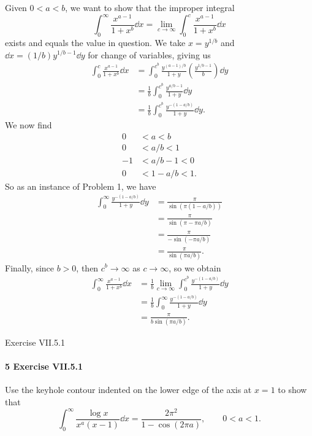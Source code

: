 \documentclass[12pt]{article}
\newenvironment{fullbox}{\begin{lrbox}{\savefullbox}\begin{minipage}{\dimexpr\textwidth-2\fboxsep\relax}}{\end{minipage}\end{lrbox}\begin{center}\framebox[\textwidth]{\usebox{\savefullbox}}\end{center}}
\newenvironment{pbox}[1][]{\begin{fullbox}\ifx#1\empty\else\paragraph{#1}\fi}{\end{fullbox}}
\theoremstyle{definition}
\newcommand{\pfrac}[2]{\left(\frac{#1}{#2}\right)}
\begin{document}
Given $0 < a < b$, we want to show that the improper integral
\[
        \int_{0}^{\infty} \frac{x^{a-1}}{1 + x^b} \dd{x}
            =\lim_{c \to \infty} \int_{0}^{c} \frac{x^{a-1}}{1 + x^b} \dd{x}
\]
exists and equals the value in question. We take $x = y^{1/b}$ and $\dd{x} = (1/b)y^{1/b - 1}\dd{y}$ for change of variables, giving us
\begin{align*}
    \int_{0}^{c} \frac{x^{a-1}}{1 + x^b} \dd{x}
        &= \int_{0}^{c^b} \frac{y^{(a-1)/b}}{1 + y} \pfrac{y^{1/b-1}}{b} \dd{y} \\
        &= \frac{1}{b} \int_{0}^{c^b} \frac{y^{a/b-1}}{1 + y} \dd{y} \\
        &= \frac{1}{b} \int_{0}^{c^b} \frac{y^{-(1 - a/b)}}{1 + y} \dd{y}.
\end{align*}
We now find
\begin{align*}
    0 &< a < b \\
    0 &< a/b < 1 \\
    -1 &< a/b - 1 < 0 \\
    0 &< 1 - a/b < 1.
\end{align*}
So as an instance of Problem 1, we have
\begin{align*}
    \int_{0}^{\infty} \frac{y^{-(1 - a/b)}}{1 + y} \dd{y}
        &= \frac{\pi}{\sin(\pi(1 - a/b))} \\
        &= \frac{\pi}{\sin(\pi - \pi a/b)} \\
        &= \frac{\pi}{-\sin(-\pi a/b)} \\
        &= \frac{\pi}{\sin(\pi a/b)}.
\end{align*}
Finally, since $b > 0$, then $c^b \to \infty$ as $c \to \infty$, so we obtain
\begin{align*}
    \int_{0}^{\infty} \frac{x^{a-1}}{1 + x^b} \dd{x}
        &= \frac{1}{b} \lim_{c \to \infty} \int_{0}^{c^b} \frac{y^{-(1 - a/b)}}{1 + y} \dd{y} \\
        &= \frac{1}{b} \int_{0}^{\infty} \frac{y^{-(1 - a/b)}}{1 + y} \dd{y} \\
        &= \frac{\pi}{b\sin(\pi a/b)}.
\end{align*}





\newpage
\begin{pbox}[5 Exercise VII.5.1]
    Use the keyhole contour indented on the lower edge of the axis at $x=1$ to show that
    \[
        \int_{0}^{\infty} \frac{\log x}{x^a(x-1)} \dd{x} = \frac{2\pi^2}{1 - \cos (2\pi a)}, \qquad 0 < a < 1.
    \]
\end{pbox}
\end{document}
